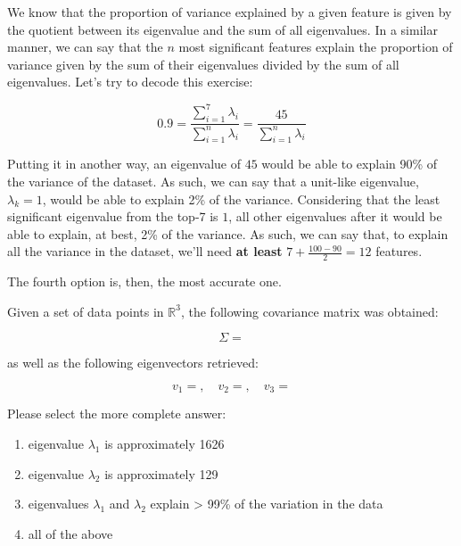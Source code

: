 \documentclass[12pt]{article}
\begin{document}
\begin{enumerate}[leftmargin=\labelsep]
  We know that the proportion of variance explained by a given feature
  is given by the quotient between its eigenvalue and the sum of all
  eigenvalues. In a similar manner, we can say that the $n$ most significant
  features explain the proportion of variance given by the sum of their
  eigenvalues divided by the sum of all eigenvalues. Let's try to decode this exercise:

  \begin{equation*}
    0.9 = \frac{\sum_{i=1}^7 \lambda_i}{\sum_{i=1}^n \lambda_i} = \frac{45}{\sum_{i=1}^n \lambda_i}
  \end{equation*}

  Putting it in another way, an eigenvalue of $45$ would be able to explain
  90\% of the variance of the dataset. As such, we can say that a unit-like
  eigenvalue, $\lambda_k = 1$, would be able to explain 2\% of the variance.
  Considering that the least significant eigenvalue from the top-7 is $1$,
  all other eigenvalues after it would be able to explain, at best, 2\% of the
  variance. As such, we can say that, to explain all the variance in the dataset,
  we'll need \textbf{at least} $7 + \frac{100 - 90}{2} = 12$ features.

  The fourth option is, then, the most accurate one.

  \begin{tcolorbox}[enhanced jigsaw,halign=center,colback=bg,boxrule=0pt,arc=1pt]
    \item Given a set of data points in $\mathbb{R}^3$, the following covariance
    matrix was obtained:

    \begin{equation*}
      \Sigma = 
    \end{equation*}

    as well as the following eigenvectors retrieved:

    \begin{equation*}
      v_1 = , \quad v_2 = , \quad v_3 = 
    \end{equation*}

    Please select the more complete answer:

    \begin{enumerate}
      \item eigenvalue $\lambda_1$ is approximately 1626
      \item eigenvalue $\lambda_2$ is approximately 129
      \item eigenvalues $\lambda_1$ and $\lambda_2$ explain > 99\% of the variation in the data
      \item all of the above
    \end{enumerate}
  \end{tcolorbox}


\end{enumerate}
\end{document}
